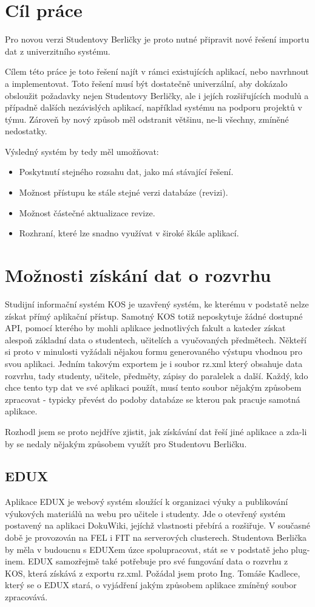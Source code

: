 \documentclass[11pt,twoside,a4paper]{book}
\begin{document}
\section{Cíl práce}
Pro novou verzi Studentovy Berličky je proto nutné připravit nové řešení importu dat z univerzitního systému.

Cílem této práce je toto řešení najít v rámci existujících aplikací, nebo navrhnout a implementovat. Toto řešení musí být dostatečně univerzální, aby dokázalo obsloužit požadavky nejen Studentovy Berličky, ale i jejích rozšiřujících modulů a případně dalších nezávislých aplikací, například systému na podporu projektů v týmu. Zároveň by nový způsob měl odstranit většinu, ne-li všechny, zmíněné nedostatky.

Výsledný systém by tedy měl umožňovat:
\begin{itemize}
\item Poskytnutí stejného rozsahu dat, jako má stávající řešení.
\item Možnost přístupu ke stále stejné verzi databáze (revizi).
\item Možnost částečné aktualizace revize.
\item Rozhraní, které lze snadno využívat v široké škále aplikací.
\end{itemize}

\section{Možnosti získání dat o rozvrhu}

Studijní informační systém KOS je uzavřený systém, ke kterému v podstatě nelze získat přímý aplikační přístup. Samotný KOS totiž neposkytuje žádné dostupné API, pomocí kterého by mohli aplikace jednotlivých fakult a kateder získat alespoň základní data o studentech, učitelích a vyučovaných předmětech. Někteří si proto v minulosti vyžádali nějakou formu generovaného výstupu vhodnou pro svou aplikaci. Jedním takovým exportem je i soubor rz.xml který obsahuje data rozvrhu, tady studenty, učitele, předměty, zápisy do paralelek a další. Každý, kdo chce tento typ dat ve své aplikaci použít, musí tento soubor nějakým způsobem zpracovat - typicky převést do podoby databáze se kterou pak pracuje samotná aplikace. 

Rozhodl jsem se proto nejdříve zjistit, jak získávání dat řeší jiné aplikace a zda-li by se nedaly nějakým způsobem využít pro Studentovu Berličku.

\subsection{EDUX}
Aplikace EDUX je webový systém sloužící k organizaci výuky a publikování výukových materiálů na webu pro učitele i studenty. Jde o otevřený systém postavený na aplikaci DokuWiki, jejíchž vlastnosti přebírá a rozšiřuje. V současné době je provozován na FEL i FIT na serverových clusterech. Studentova Berlička by měla v budoucnu s EDUXem úzce spolupracovat, stát se v podstatě jeho plug-inem. EDUX samozřejmě také potřebuje pro své fungování data o rozvrhu z KOS, která získává z exportu rz.xml. Požádal jsem proto Ing. Tomáše Kadlece, který se o EDUX stará, o vyjádření jakým způsobem aplikace zmíněný soubor zpracovává.
\end{document}
